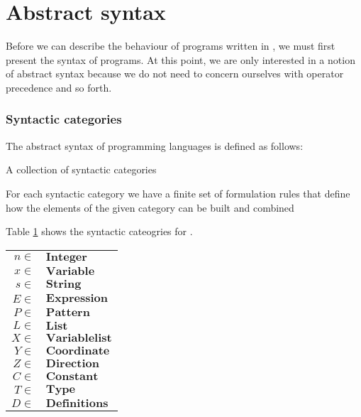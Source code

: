 \section{Abstract syntax}
Before we can describe the behaviour of programs written in
\productname{}, we must first present the syntax of programs. At this point, we 
are only interested in a notion of abstract syntax because we do not need to
concern ourselves with operator precedence and so forth.

\subsubsection{Syntactic categories}
The abstract syntax of programming languages is defined as
follows\cite[pg. 27]{tt-hh}:

\begin{dlist}
  \item A collection of syntactic categories
  \item For each syntactic category we have a finite set of formulation rules
    that define how the elements of the given category can be built and
    combined
\end{dlist}

Table \ref{table:syn-cat} shows the syntactic cateogries for
\productname{}.

\begin{table}[ht]
  \begin{center}
    \begin{tabular}{rl}
      \hline
      $n \in$ & $\mathbf{Integer}$       \\
      $x \in$ & $\mathbf{Variable}$      \\
      $s \in$ & $\mathbf{String}$        \\
      $E \in$ & $\mathbf{Expression}$    \\
      $P \in$ & $\mathbf{Pattern}$       \\
      $L \in$ & $\mathbf{List}$          \\
      $X \in$ & $\mathbf{Variable list}$ \\
      $Y \in$ & $\mathbf{Coordinate}$    \\
      $Z \in$ & $\mathbf{Direction}$     \\
      $C \in$ & $\mathbf{Constant}$      \\
      $T \in$ & $\mathbf{Type}$          \\
      $D \in$ & $\mathbf{Definitions}$   \\
      \hline
    \end{tabular}  
    \label{table:syn-cat}
  \end{center}
\end{table}

